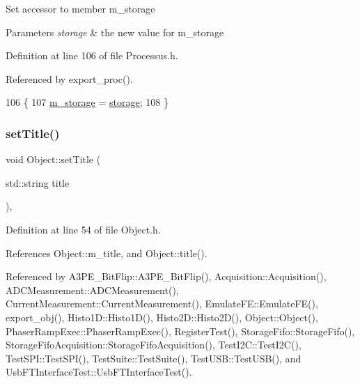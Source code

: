 Set accessor to member m\+\_\+storage 
\begin{DoxyParams}{Parameters}
{\em storage} & the new value for m\+\_\+storage \\
\hline
\end{DoxyParams}


Definition at line 106 of file Processus.\+h.



Referenced by export\+\_\+proc().


\begin{DoxyCode}
106                                       \{
107     \hyperlink{classProcessus_a132b1e71f72327e5a87f0a168c7b6325}{m\_storage} = \hyperlink{classProcessus_a33fa1a0b54a636e5cdd680669fd9ea51}{storage};
108   \}
\end{DoxyCode}
\mbox{\label{classObject_a89557dbbad5bcaa02652f5d7fa35d20f}} 
\subsubsection{\texorpdfstring{set\+Title()}{setTitle()}}
{\footnotesize\ttfamily void Object\+::set\+Title (\begin{DoxyParamCaption}\item[{std\+::string}]{title }\end{DoxyParamCaption})\hspace{0.3cm}{\ttfamily [inline]}, {\ttfamily [inherited]}}



Definition at line 54 of file Object.\+h.



References Object\+::m\+\_\+title, and Object\+::title().



Referenced by A3\+P\+E\+\_\+\+Bit\+Flip\+::\+A3\+P\+E\+\_\+\+Bit\+Flip(), Acquisition\+::\+Acquisition(), A\+D\+C\+Measurement\+::\+A\+D\+C\+Measurement(), Current\+Measurement\+::\+Current\+Measurement(), Emulate\+F\+E\+::\+Emulate\+F\+E(), export\+\_\+obj(), Histo1\+D\+::\+Histo1\+D(), Histo2\+D\+::\+Histo2\+D(), Object\+::\+Object(), Phaser\+Ramp\+Exec\+::\+Phaser\+Ramp\+Exec(), Register\+Test(), Storage\+Fifo\+::\+Storage\+Fifo(), Storage\+Fifo\+Acquisition\+::\+Storage\+Fifo\+Acquisition(), Test\+I2\+C\+::\+Test\+I2\+C(), Test\+S\+P\+I\+::\+Test\+S\+P\+I(), Test\+Suite\+::\+Test\+Suite(), Test\+U\+S\+B\+::\+Test\+U\+S\+B(), and Usb\+F\+T\+Interface\+Test\+::\+Usb\+F\+T\+Interface\+Test().


